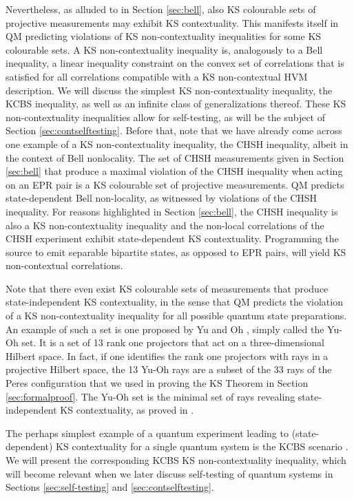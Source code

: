 Nevertheless, as alluded to in Section \ref{sec:bell}, also KS colourable sets of projective measurements may exhibit KS contextuality. This manifests itself in QM predicting violations of KS non-contextuality inequalities for some KS colourable sets. A KS non-contextuality inequality is, analogously to a Bell inequality, a linear inequality constraint on the convex set of correlations that is satisfied for all correlations compatible with a KS non-contextual HVM description. We will discuss the simplest KS non-contextuality inequality, the KCBS inequality, as well as an infinite class of generalizations thereof. These KS non-contextuality inequalities allow for self-testing, as will be the subject of Section \ref{sec:contselftesting}. Before that, note that we have already come across one example of a KS non-contextuality inequality, the CHSH inequality, albeit in the context of Bell nonlocality. The set of CHSH measurements given in Section \ref{sec:bell} that produce a maximal violation of the CHSH inequality when acting on an EPR pair is a KS colourable set of projective measurements. QM predicts state-dependent Bell non-locality, as witnessed by violations of the CHSH inequality. For reasons highlighted in Section \ref{sec:bell}, the CHSH inequality is also a KS non-contextuality inequality and the non-local correlations of the CHSH experiment exhibit state-dependent KS contextuality. Programming the source to emit separable bipartite states, as opposed to EPR pairs, will yield KS non-contextual correlations.

Note that there even exist KS colourable sets of measurements that produce state-independent KS contextuality, in the sense that QM predicts the violation of a KS non-contextuality inequality for all possible quantum state preparations. An example of such a set is one proposed by Yu and Oh \cite{Yu2012}, simply called the Yu-Oh set. It is a set of 13 rank one projectors that act on a three-dimensional Hilbert space. In fact, if one identifies the rank one projectors with rays in a projective Hilbert space, the 13 Yu-Oh rays are a subset of the 33 rays of the Peres configuration that we used in proving the KS Theorem in Section \ref{sec:formalproof}. The Yu-Oh set is the minimal set of rays revealing state-independent KS contextuality, as proved in \cite{Cabello2016}.

The perhaps simplest example of a quantum experiment leading to (state-dependent) KS contextuality for a single quantum system is the KCBS scenario \cite{Klyachko2008}. We will present the corresponding KCBS KS non-contextuality inequality, which will become relevant when we later discuss self-testing of quantum systems in Sections \ref{sec:self-testing} and \ref{sec:contselftesting}. 

